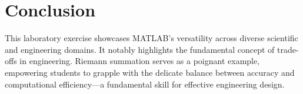 \documentclass[12pt, a4paper]{article}
\begin{document}
	\section{Conclusion}
		This laboratory exercise showcases MATLAB's versatility across diverse scientific and engineering domains. It notably highlights the fundamental concept of trade-offs in engineering. Riemann summation serves as a poignant example, empowering students to grapple with the delicate balance between accuracy and computational efficiency—a fundamental skill for effective engineering design.
\end{document}
